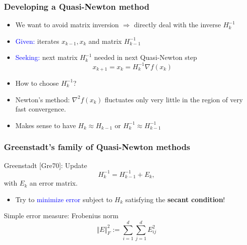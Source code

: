 \documentclass{beamer}
\begin{document}
\begin{frame}
  \frametitle{Developing a Quasi-Newton method}
  \begin{itemize}
    \item We want to avoid matrix inversion
          $\Rightarrow$ directly deal with the inverse $H_k^{-1}$
    \item \textcolor{blue}{Given:} iterates $x_{k-1}, x_k$ and matrix $H_{k-1}^{-1}$
    \item \textcolor{blue}{Seeking:} next matrix $H_k^{-1}$ needed in next Quasi-Newton step
          \begin{equation}
            x_{k+1} = x_k = H_k^{-1} \nabla f(x_k)
          \end{equation}
    \item How to choose $H_k^{-1}$?
    \item Newton’s method: $\nabla^2 f(x_k)$ fluctuates only very little in the region of very fast convergence.
    \item Makes sense to have $H_k \approx H_{k-1}$ or $H_k^{-1} \approx H_{k-1}^{-1}$
  \end{itemize}
\end{frame}


\begin{frame}
  \frametitle{Greenstadt's family of Quasi-Newton methods}
  Greenstadt [Gre70]: Update
  \begin{equation}
    H_k^{-1} = H_{k-1}^{-1} + E_k,
  \end{equation}
  with $E_k$ an error matrix.
  \begin{itemize}
    \item Try to \textcolor{blue}{minimize error} subject to $H_k$ satisfying the \textbf{secant condition}!
  \end{itemize}

  Simple error measure: Frobenius norm
  \begin{equation}
    \Vert E \Vert_F^2 := \sum_{i=1}^{d} \sum_{j=1}^{d} E_{ij}^2
  \end{equation}
\end{frame}
\end{document}
